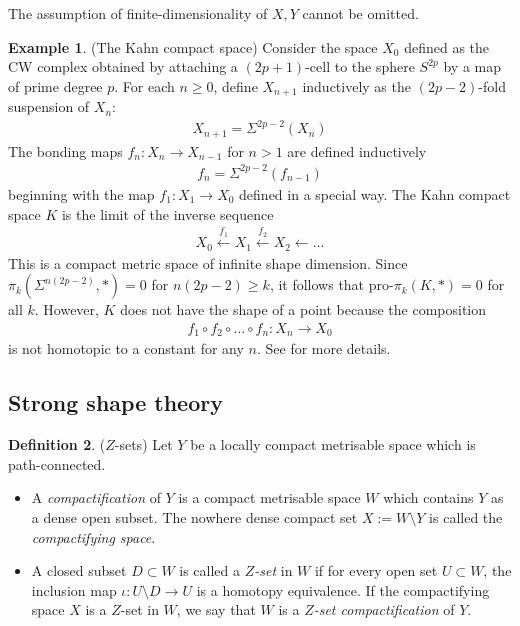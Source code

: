 \documentclass[a4paper,11pt]{article}
\theoremstyle{definition}
\newtheorem{definition}{Definition}[section]
\newtheorem{example}[definition]{Example}
\theoremstyle{plain}
\theoremstyle{remark}
\begin{document}
{The assumption of finite-dimensionality of $X,Y$ cannot be omitted. 

\begin{example} (The Kahn compact space) Consider the space $X_0$ defined as the CW complex obtained by attaching a $(2p+1)$-cell to the sphere $S^{2p}$ by a map of prime degree $p$. For each $n\geq 0$, define $X_{n+1}$ inductively as the $(2p-2)$-fold suspension of $X_{n}$:
\begin{align*}
X_{n+1} = \Sigma^{2p-2}(X_{n})
\end{align*}
The bonding maps $f_{n}: X_{n}\rightarrow X_{n-1}$ for $n>1$ are defined inductively 
\begin{align*}
f_{n} = \Sigma^{2p-2}(f_{n-1})
\end{align*}
beginning with the map $f_{1}: X_{1}\rightarrow X_{0}$ defined in a special way. The Kahn compact space $K$ is the limit of the inverse sequence 
\begin{align*}
X_{0}\xleftarrow{f_{1}} X_{1} \xleftarrow{f_{2}} X_{2} \leftarrow \dots
\end{align*}
This is a compact metric space of infinite shape dimension. Since $\pi_{k}(\Sigma^{n(2p-2)},\ast)=0$ for $n(2p-2)\geq k$, it follows that pro-$\pi_{k}(K,\ast)=0$ for all $k$. However, $K$ does not have the shape of a point because the composition 
\begin{align*}
f_{1}\circ f_{2}\circ \dots \circ f_{n}: X_{n}\rightarrow X_{0}
\end{align*}
is not homotopic to a constant for any $n$. See \cite{draper1976example} for more details. 
\end{example}

\subsection{Strong shape theory} \label{strongshapetheory}

\begin{definition} ($Z$-sets)
Let $Y$ be a locally compact metrisable space which is path-connected. 
\begin{itemize}
\item A \textit{compactification} of $Y$ is a compact metrisable space $W$ which contains $Y$ as a dense open subset. The nowhere dense compact set $X:=W\setminus Y$ is called the \textit{compactifying space}.
\item A closed subset $D\subset W$ is called a \textit{$Z$-set} in $W$ if for every open set $U\subset W$, the inclusion map $\iota: U\setminus D \rightarrow U$ is a homotopy equivalence. If the compactifying space $X$ is a $Z$-set in $W$, we say that $W$ is a \textit{$Z$-set compactification} of $Y$. 
\end{itemize}
\end{definition}

}
\end{document}

